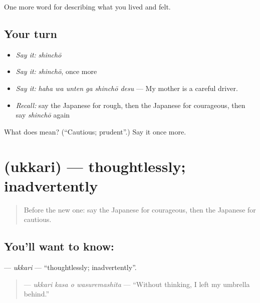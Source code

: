 \begin{grammarlens}[title={What you've built}]
One more word for describing what you lived and felt.
\end{grammarlens}

\subsection*{Your turn}
\begin{itemize}
\raggedright
  \item \emph{Say it:} \emph{shinchō}
  \item \emph{Say it:} \emph{shinchō}, once more
  \item \emph{Say it:} \emph{haha wa unten ga shinchō desu} — My mother is a careful driver.
  \item \emph{Recall:} say the Japanese for rough, then the Japanese for courageous, then say \emph{shinchō} again
\end{itemize}

\begin{tcolorbox}[breakable,colback=teal!4,colframe=teal!35!black,title={Before you move on}]
What does  mean? (\textquotedblleft{}Cautious; prudent\textquotedblright{}.) Say it once more.
\end{tcolorbox}
\section[\texorpdfstring{\ja{うっかり} (ukkari)}{うっかり (ukkari)}]{ (ukkari) — thoughtlessly; inadvertently}

\label{lesson:JA-C440-ukkari}



\begin{quote}
Before the new one: say the Japanese for courageous, then the Japanese for cautious.
\end{quote}

\subsection*{You'll want to know: }
\textbf{} — \emph{ukkari} — \textquotedblleft{}thoughtlessly; inadvertently\textquotedblright{}.

\begin{quote}
\textbf{  } — \emph{ukkari kasa o wasuremashita} — \textquotedblleft{}Without thinking, I left my umbrella behind.\textquotedblright{}
\end{quote}

